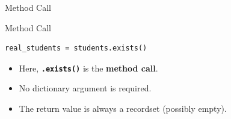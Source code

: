 \begin{frame}[fragile]{Method Call}
\begin{block}{Method Call}
\begin{lstlisting}
real_students = students.exists()
\end{lstlisting}
	\begin{itemize}
		\item Here, \textbf{\texttt{.exists()}} is the \textbf{method call}.
		\item No dictionary argument is required.
		\item The return value is always a recordset (possibly empty).
	\end{itemize}
\end{block}
\end{frame}

